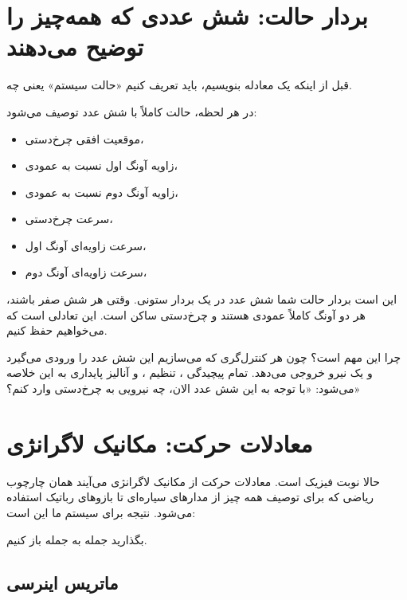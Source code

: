 \documentclass[12pt, a4paper]{article}
\newcommand{\dash}{\lr{---}}
\begin{document}
\section{بردار حالت: شش عددی که همه‌چيز را توضيح می‌دهند}

قبل از اينکه يک معادله بنويسيم، بايد تعريف کنيم «حالت سيستم» يعنی چه.

در هر لحظه، حالت  کاملاً با شش عدد توصيف می‌شود:

\begin{itemize}
  \item موقعيت افقی چرخ‌دستی، 
  \item زاويه آونگ اول نسبت به عمودی، 
  \item زاويه آونگ دوم نسبت به عمودی، 
  \item سرعت چرخ‌دستی، 
  \item سرعت زاويه‌ای آونگ اول، 
  \item سرعت زاويه‌ای آونگ دوم، 
\end{itemize}

اين است بردار حالت شما \dash{} شش عدد در يک بردار ستونی. وقتی هر شش صفر باشند، هر دو آونگ کاملاً عمودی هستند و چرخ‌دستی ساکن است. اين تعادلی است که می‌خواهيم حفظ کنيم.

چرا اين مهم است؟ چون هر کنترل‌گری که می‌سازيم اين شش عدد را ورودی می‌گيرد و يک نيرو خروجی می‌دهد. تمام پيچيدگی ، تنظيم ، و آناليز پايداری به اين خلاصه می‌شود: «با توجه به اين شش عدد الان، چه نيرويی به چرخ‌دستی وارد کنم؟»

\section{معادلات حرکت: مکانيک لاگرانژی}

حالا نوبت فيزيک است. معادلات حرکت از مکانيک لاگرانژی می‌آيند \dash{} همان چارچوب رياضی که برای توصيف همه چيز از مدارهای سياره‌ای تا بازوهای رباتيک استفاده می‌شود. نتيجه برای سيستم ما اين است:

\begin{center}
\mbox{}
\end{center}

بگذاريد جمله به جمله باز کنيم.

\subsection{ماتريس اينرسی}
\end{document}
